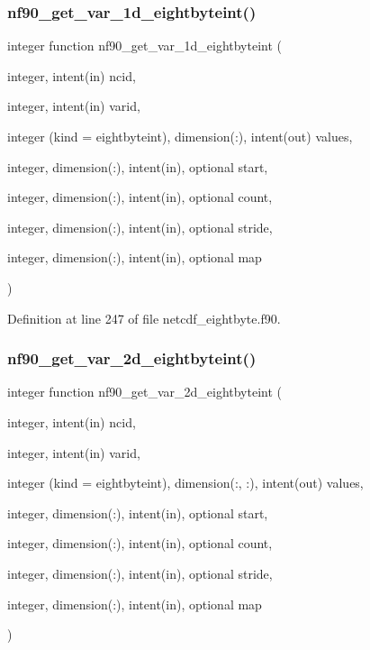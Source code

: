 \subsubsection{\texorpdfstring{nf90\+\_\+get\+\_\+var\+\_\+1d\+\_\+eightbyteint()}{nf90\_get\_var\_1d\_eightbyteint()}}
{\footnotesize\ttfamily integer function nf90\+\_\+get\+\_\+var\+\_\+1d\+\_\+eightbyteint (\begin{DoxyParamCaption}\item[{integer, intent(in)}]{ncid,  }\item[{integer, intent(in)}]{varid,  }\item[{integer (kind = eightbyteint), dimension(\+:), intent(out)}]{values,  }\item[{integer, dimension(\+:), intent(in), optional}]{start,  }\item[{integer, dimension(\+:), intent(in), optional}]{count,  }\item[{integer, dimension(\+:), intent(in), optional}]{stride,  }\item[{integer, dimension(\+:), intent(in), optional}]{map }\end{DoxyParamCaption})}



Definition at line 247 of file netcdf\+\_\+eightbyte.\+f90.

\mbox{\label{netcdf__eightbyte_8f90_ac52730b7beb0dfd1e6350756edbd2168}} 
\subsubsection{\texorpdfstring{nf90\+\_\+get\+\_\+var\+\_\+2d\+\_\+eightbyteint()}{nf90\_get\_var\_2d\_eightbyteint()}}
{\footnotesize\ttfamily integer function nf90\+\_\+get\+\_\+var\+\_\+2d\+\_\+eightbyteint (\begin{DoxyParamCaption}\item[{integer, intent(in)}]{ncid,  }\item[{integer, intent(in)}]{varid,  }\item[{integer (kind = eightbyteint), dimension(\+:, \+:), intent(out)}]{values,  }\item[{integer, dimension(\+:), intent(in), optional}]{start,  }\item[{integer, dimension(\+:), intent(in), optional}]{count,  }\item[{integer, dimension(\+:), intent(in), optional}]{stride,  }\item[{integer, dimension(\+:), intent(in), optional}]{map }\end{DoxyParamCaption})}



